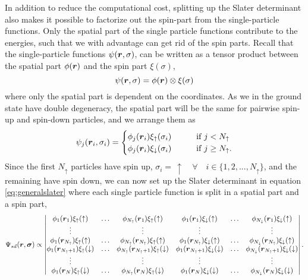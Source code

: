 In addition to reduce the computational cost, splitting up the Slater determinant also makes it possible to factorize out the spin-part from the single-particle functions. Only the spatial part of the single particle functions contribute to the energies, such that we with advantage can get rid of the spin parts. Recall that the single-particle functions $\psi(\boldsymbol{{r}},\sigma)$, can be written as a tensor product between the spatial part $\phi(\boldsymbol{{r}})$ and the spin part $\xi(\sigma)$, 
\begin{equation}
\psi(\boldsymbol{{r}},\sigma)=\phi(\boldsymbol{{r}})\otimes\xi(\sigma) 
\end{equation}
where only the spatial part is dependent on the coordinates. As we in the ground state have double degeneracy, the spatial part will be the same for pairwise spin-up and spin-down particles, and we arrange them as
\begin{equation}
\psi_j(\boldsymbol{{r}}_i,\sigma_i)=
\begin{cases}
\phi_j(\boldsymbol{{r}}_i)\xi_{\uparrow}(\sigma_i)\quad\quad&\text{if } j<N_{\uparrow}\\
\phi_j(\boldsymbol{{r}}_i)\xi_{\downarrow}(\sigma_i)\quad\quad&\text{if } j\geq N_{\uparrow}.
\end{cases}
\end{equation}
Since the first $N_{\uparrow}$ particles have spin up, $\sigma_i=\,\uparrow\quad\forall\quad i\in\{1,2,...,N_{\uparrow}\}$, and the remaining have spin down, we can now set up the Slater determinant in equation \eqref{eq:generalslater} where each single particle function is split in a spatial part and a spin part,
\begin{equation*}
\Psi_{sd}(\boldsymbol{r},\boldsymbol{{\sigma}})\propto
\begin{vmatrix}
\phi_1(\boldsymbol{r}_1)\xi_{\uparrow}(\uparrow) & \hdots & \phi_{N_{\uparrow}}(\boldsymbol{r}_1)\xi_{\uparrow}(\uparrow) & \phi_{1}(\boldsymbol{r}_1)\xi_{\downarrow}(\uparrow) & \hdots & \phi_{N_{\downarrow}}(\boldsymbol{r}_1)\xi_{\downarrow}(\uparrow)\\
\vdots & & \vdots & \vdots & & \vdots \\
\phi_1(\boldsymbol{r}_{N_{\uparrow}})\xi_{\uparrow}(\uparrow) & \hdots & \phi_{N_{\uparrow}}(\boldsymbol{r}_{N_{\uparrow}})\xi_{\uparrow}(\uparrow) & \phi_{1}(\boldsymbol{r}_{N_{\uparrow}})\xi_{\downarrow}(\uparrow) & \hdots & \phi_{N_{\downarrow}}(\boldsymbol{r}_{N_{\uparrow}})\xi_{\downarrow}(\uparrow)\\
\phi_1(\boldsymbol{r}_{N_{\uparrow}+1})\xi_{\uparrow}(\downarrow) & \hdots & \phi_{N_{\uparrow}}(\boldsymbol{r}_{N_{\uparrow}+1})\xi_{\uparrow}(\downarrow) & \phi_{1}(\boldsymbol{r}_{N_{\uparrow}+1})\xi_{\downarrow}(\downarrow) & \hdots & \phi_{N_{\downarrow}}(\boldsymbol{r}_{N_{\uparrow}+1})\xi_{\downarrow}(\downarrow)\\
\vdots & & \vdots & \vdots & & \vdots \\
\phi_1(\boldsymbol{r}_N)\xi_{\uparrow}(\downarrow) & \hdots & \phi_{N_{\uparrow}}(\boldsymbol{r}_N)\xi_{\uparrow}(\downarrow) & \phi_{1}(\boldsymbol{r}_N)\xi_{\downarrow}(\downarrow) & \hdots & \phi_{N_{\downarrow}}(\boldsymbol{r}_N)\xi_{\downarrow}(\downarrow)\\
\end{vmatrix}.
\end{equation*}
